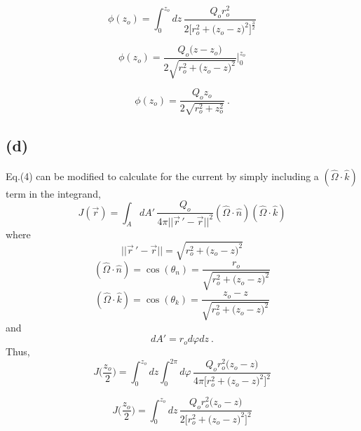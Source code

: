 \documentclass{article}
\begin{document}
\begin{equation*}
\phi(z_o) =\int_0^{z_o} dz  \, \frac{Q_o r_o^2}{2 \Big[ r_o^2 + \big(z_o-z\big)^2 \Big]^{\frac{3}{2}}} 
\end{equation*}

\begin{equation*}
\phi(z_o) = \frac{Q_o \big(z-z_o\big)}{2 \sqrt{ r_o^2 + \big(z_o-z\big)^2 }} \Big|_0^{z_o}
\end{equation*}

\begin{equation*}
\boxed{ \phi(z_o) = \frac{Q_o  z_o}{2 \sqrt{ r_o^2 + z_o^2 }} } \: .
\end{equation*}

\pagebreak

\subsection*{(d)}

Eq.(4) can be modified to calculate for the current by simply including a $(\hat{\Omega} \cdot \hat{k})$ term in the integrand, 
\begin{equation*}
J(\vec{r}) = \int_A dA' \, \frac{Q_o}{4 \pi ||\vec{r}\,'-\vec{r}||^2}  (\hat{\Omega} \cdot \hat{n}) (\hat{\Omega} \cdot \hat{k})
\end{equation*}
where 
\begin{equation*}
||\vec{r}\,'-\vec{r}|| =  \sqrt{ r_o^2 + \big(z_o - z\big)^2 } 
\end{equation*}
\begin{equation*}
(\hat{\Omega} \cdot \hat{n}) = \cos(\theta_n) = \frac{r_o}{\sqrt{ r_o^2 + \big(z_o -z \big)^2 } }
\end{equation*}
\begin{equation*}
(\hat{\Omega} \cdot \hat{k}) = \cos(\theta_k) = \frac{z_o - z}{\sqrt{ r_o^2 + \big(z_o - z\big)^2 } }
\end{equation*}
and
\begin{equation*}
dA' = r_o d\varphi dz \: .
\end{equation*}
Thus,
\begin{equation*}
J\Big(\frac{z_o}{2}\Big) =\int_0^{z_o} dz \int_0^{2\pi} d\varphi \, \frac{Q_o r_o^2 \big(z_o - z\big)}{4 \pi \Big[ r_o^2 + \big(z_o-z\big)^2 \Big]^2} 
\end{equation*}

\begin{equation*}
J\Big(\frac{z_o}{2}\Big) =\int_0^{z_o} dz  \, \frac{Q_o r_o^2 \big(z_o - z\big)}{2 \Big[ r_o^2 + \big(z_o-z\big)^2 \Big]^2} 
\end{equation*}
\end{document}
